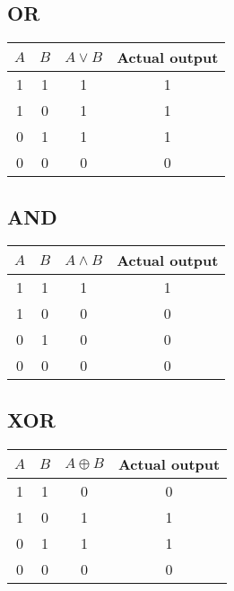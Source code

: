 \documentclass[11pt,a4paper]{article}
\begin{document}

\subsection*{OR} %
\label{sub:OR}

\begin{table}[htb!]
    \centering
    \begin{tabular}{c | c || c || c}
        $A$ & $B$ & $A \lor B$ & Actual output \\ \hline
        1   & 1   & 1          & 1        \\
        1   & 0   & 1          & 1        \\
        0   & 1   & 1          & 1        \\
        0   & 0   & 0          & 0        \\
    \end{tabular}
\end{table}


\subsection*{AND} %
\label{sub:AND}

\begin{table}[htb!]
    \centering
    \begin{tabular}{c | c || c || c}
        $A$ & $B$ & $A \land B$ & Actual output \\ \hline
        1 & 1 & 1                & 1        \\
        1 & 0 & 0                & 0        \\
        0 & 1 & 0                & 0        \\
        0 & 0 & 0                & 0        \\
    \end{tabular}
\end{table}


\subsection*{XOR} %
\label{sub:XOR}

\begin{table}[htb!]
    \centering
    \begin{tabular}{c | c || c || c}
        $A$ & $B$ & $A \oplus B$ & Actual output \\ \hline
        1 & 1 & 0                & 0        \\
        1 & 0 & 1                & 1        \\
        0 & 1 & 1                & 1        \\
        0 & 0 & 0                & 0        \\
    \end{tabular}
\end{table}
\end{document}
